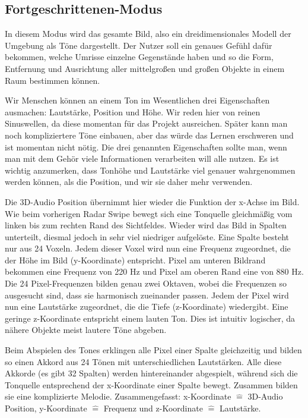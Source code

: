 \documentclass[a4paper,12pt,ngerman]{scrartcl}
\begin{document}
\subsection{Fortgeschrittenen-Modus}

In diesem Modus wird das gesamte Bild, also ein dreidimensionales Modell der Umgebung als Töne dargestellt. 
Der Nutzer soll ein genaues Gefühl dafür bekommen, welche Umrisse einzelne Gegenstände haben und so die Form, Entfernung und Ausrichtung aller mittelgroßen und großen Objekte in einem Raum bestimmen können. \par 
Wir Menschen können an einem Ton im Wesentlichen drei
Eigenschaften ausmachen: Lautstärke, Position und Höhe. Wir reden hier von reinen Sinuswellen, da diese momentan für 
das Projekt ausreichen. Später kann man noch kompliziertere Töne einbauen, aber das würde das Lernen erschweren
und ist momentan nicht nötig. Die drei genannten Eigenschaften sollte man, wenn man mit dem Gehör viele Informationen
verarbeiten will alle nutzen. Es ist wichtig anzumerken, dass Tonhöhe und Lautstärke viel genauer wahrgenommen werden
können, als die Position, und wir sie daher mehr verwenden. \par 
Die 3D-Audio Position übernimmt hier wieder die Funktion der x-Achse im Bild. Wie beim vorherigen Radar Swipe bewegt
sich eine Tonquelle gleichmäßig vom linken bis zum rechten Rand des Sichtfeldes. Wieder wird das Bild in Spalten 
unterteilt, diesmal jedoch in sehr viel niedriger aufgelöste. Eine Spalte besteht nur aus 24 Voxeln.
Jedem dieser Voxel wird nun eine Frequenz zugeordnet, die der Höhe im Bild (y-Koordinate) entspricht.
Pixel am unteren Bildrand bekommen eine Frequenz von 220 Hz und Pixel am oberen Rand eine von 880 Hz. Die 24 
Pixel-Frequenzen bilden genau zwei Oktaven, wobei die Frequenzen so ausgesucht sind, dass sie harmonisch zueinander
passen. Jedem der Pixel wird nun eine Lautstärke zugeordnet, die die Tiefe (z-Koordinate) wiedergibt. Eine geringe
z-Koordinate entspricht einem lauten Ton. Dies ist intuitiv logischer, da nähere Objekte meist lautere Töne abgeben.
\par 
Beim Abspielen des Tones erklingen alle Pixel einer Spalte gleichzeitig und bilden so einen Akkord aus 24 Tönen 
mit unterschiedlichen Lautstärken. Alle diese Akkorde (es gibt 32 Spalten) werden hintereinander abgespielt, während
sich die Tonquelle entsprechend der x-Koordinate einer Spalte bewegt. Zusammen bilden sie eine komplizierte Melodie.
Zusammengefasst: x-Koordinate $\hat{=}$ 3D-Audio Position, y-Koordinate $\hat{=}$ Frequenz und z-Koordinate $\hat{=}$ Lautstärke.
\end{document}
